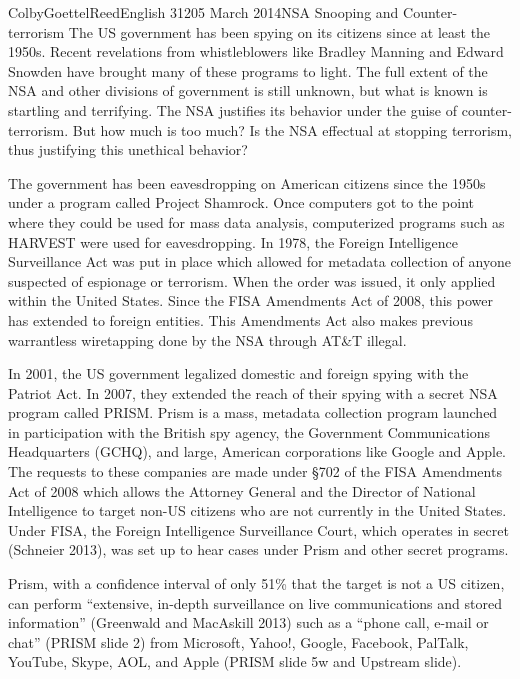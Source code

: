 \documentclass[12pt]{article}
\begin{document}
\begin{mla}{Colby}{Goettel}{Reed}{English 312}{05 March 2014}{NSA Snooping and Counter-terrorism}
The US government has been spying on its citizens since at least the 1950s. Recent revelations from whistleblowers like Bradley Manning and Edward Snowden have brought many of these programs to light. The full extent of the NSA and other divisions of government is still unknown, but what is known is startling and terrifying. The NSA justifies its behavior under the guise of counter-terrorism. But how much is too much? Is the NSA effectual at stopping terrorism, thus justifying this unethical behavior?

The government has been eavesdropping on American citizens since the 1950s under a program called Project Shamrock. Once computers got to the point where they could be used for mass data analysis, computerized programs such as HARVEST were used for eavesdropping. In 1978, the Foreign Intelligence Surveillance Act was put in place which allowed for metadata collection of anyone suspected of espionage or terrorism. When the order was issued, it only applied within the United States. Since the FISA Amendments Act of 2008, this power has extended to foreign entities. This Amendments Act also makes previous warrantless wiretapping done by the NSA through AT\&T illegal.

In 2001, the US government legalized domestic and foreign spying with the Patriot Act. In 2007, they extended the reach of their spying with a secret NSA program called PRISM. Prism is a mass, metadata collection program launched in participation with the British spy agency, the Government Communications Headquarters (GCHQ), and large, American corporations like Google and Apple. The requests to these companies are made under \S702 of the FISA Amendments Act of 2008 which allows the Attorney General and the Director of National Intelligence to target non-US citizens who are not currently in the United States. Under FISA, the Foreign Intelligence Surveillance Court, which operates in secret (Schneier 2013), was set up to hear cases under Prism and other secret programs.

Prism, with a confidence interval of only 51\% that the target is not a US citizen, can perform ``extensive, in-depth surveillance on live communications and stored information'' (Greenwald and MacAskill 2013) such as a ``phone call, e-mail or chat'' (PRISM slide 2) from Microsoft, Yahoo!, Google, Facebook, PalTalk, YouTube, Skype, AOL, and Apple (PRISM slide 5w and Upstream slide).


\end{mla}
\end{document}
